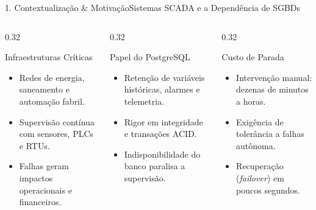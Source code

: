 \documentclass[aspectratio=169,10pt]{beamer}
\begin{document}
\begin{frame}{1. Contextualização \& Motivação}{Sistemas SCADA e a Dependência de SGBDs}
  \begin{columns}[t]
    \begin{column}{0.32\textwidth}
      \begin{block}{Infraestruturas Críticas}
        \begin{itemize}
          \item Redes de energia, saneamento e automação fabril.
          \item Supervisão contínua com sensores, PLCs e RTUs.
          \item Falhas geram impactos operacionais e financeiros.
        \end{itemize}
      \end{block}
    \end{column}
    \begin{column}{0.32\textwidth}
      \begin{block}{Papel do PostgreSQL}
        \begin{itemize}
          \item Retenção de variáveis históricas, alarmes e telemetria.
          \item Rigor em integridade e transações ACID.
          \item Indisponibilidade do banco paralisa a supervisão.
        \end{itemize}
      \end{block}
    \end{column}
    \begin{column}{0.32\textwidth}
      \begin{block}{Custo de Parada}
        \begin{itemize}
          \item Intervenção manual: dezenas de minutos a horas.
          \item Exigência de tolerância a falhas autônoma.
          \item Recuperação (\textit{failover}) em poucos segundos.
        \end{itemize}
      \end{block}
    \end{column}
  \end{columns}
\end{frame}
\end{document}
